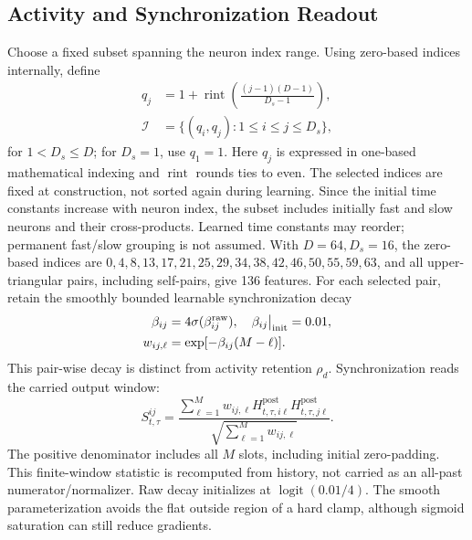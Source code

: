 \documentclass{article}
\begin{document}
\subsection{Activity and Synchronization Readout}

Choose a fixed subset spanning the neuron index range. Using zero-based indices internally, define
\begin{equation}
\begin{aligned}
q_j&=1+\operatorname{rint}\!\left(\frac{(j-1)(D-1)}{D_s-1}\right),\\
\mathcal I&=\{(q_i,q_j):1\le i\le j\le D_s\},
\end{aligned}
\label{eq:ct_sync_selection}
\end{equation}
for $1<D_s\le D$; for $D_s=1$, use $q_1=1$. Here $q_j$ is expressed in one-based mathematical indexing and $\operatorname{rint}$ rounds ties to even. The selected indices are fixed at construction, not sorted again during learning. Since the initial time constants increase with neuron index, the subset includes initially fast and slow neurons and their cross-products. Learned time constants may reorder; permanent fast/slow grouping is not assumed. With $D=64,D_s=16$, the zero-based indices are $0,4,8,13,17,21,25,29,34,38,42,46,50,55,59,63$, and all upper-triangular pairs, including self-pairs, give 136 features. For each selected pair, retain the smoothly bounded learnable synchronization decay
\begin{equation}
\begin{aligned}
\beta_{ij}&=4\sigma(\beta^{\rm raw}_{ij}),\quad \beta_{ij}\big|_{\mathrm{init}}=0.01,\\
w_{ij,\ell}&=\exp[-\beta_{ij}(M-\ell)].
\end{aligned}
\label{eq:ct_sync_weights}
\end{equation}
This pair-wise decay is distinct from activity retention $\rho_d$. Synchronization reads the carried output window:
\begin{equation}
S^{ij}_{t,\tau}=
\frac{\sum_{\ell=1}^{M}w_{ij,\ell}
 H^{\mathrm{post}}_{t,\tau,i\ell}H^{\mathrm{post}}_{t,\tau,j\ell}}
{\sqrt{\sum_{\ell=1}^{M}w_{ij,\ell}}}.
\label{eq:ct_sync_state}
\end{equation}
The positive denominator includes all $M$ slots, including initial zero-padding. This finite-window statistic is recomputed from history, not carried as an all-past numerator/normalizer. Raw decay initializes at $\operatorname{logit}(0.01/4)$. The smooth parameterization avoids the flat outside region of a hard clamp, although sigmoid saturation can still reduce gradients.
\end{document}
